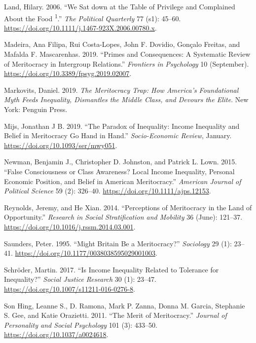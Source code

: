 \documentclass[
]{article}
\begin{document}
\leavevmode\hypertarget{ref-landWeSatTable2006}{}%
Land, Hilary. 2006. ``We Sat down at the Table of Privilege and
Complained About the Food \textsuperscript{1}.'' \emph{The Political
Quarterly} 77 (s1): 45--60.
\url{https://doi.org/10.1111/j.1467-923X.2006.00780.x}.

\leavevmode\hypertarget{ref-MadeiraPrimesConsequencesSystematic2019}{}%
Madeira, Ana Filipa, Rui Costa-Lopes, John F. Dovidio, Gonçalo Freitas,
and Mafalda F. Mascarenhas. 2019. ``Primes and Consequences: A
Systematic Review of Meritocracy in Intergroup Relations.''
\emph{Frontiers in Psychology} 10 (September).
\url{https://doi.org/10.3389/fpsyg.2019.02007}.

\leavevmode\hypertarget{ref-markovits_Meritocracy_2019}{}%
Markovits, Daniel. 2019. \emph{The Meritocracy Trap: How America's
Foundational Myth Feeds Inequality, Dismantles the Middle Class, and
Devours the Elite}. New York: Penguin Press.

\leavevmode\hypertarget{ref-mijs_paradox_2019}{}%
Mijs, Jonathan J B. 2019. ``The Paradox of Inequality: Income Inequality
and Belief in Meritocracy Go Hand in Hand.'' \emph{Socio-Economic
Review}, January. \url{https://doi.org/10.1093/ser/mwy051}.

\leavevmode\hypertarget{ref-newman_false_2015}{}%
Newman, Benjamin J., Christopher D. Johnston, and Patrick L. Lown. 2015.
``False Consciousness or Class Awareness? Local Income Inequality,
Personal Economic Position, and Belief in American Meritocracy.''
\emph{American Journal of Political Science} 59 (2): 326--40.
\url{https://doi.org/10.1111/ajps.12153}.

\leavevmode\hypertarget{ref-reynolds_perceptions_2014}{}%
Reynolds, Jeremy, and He Xian. 2014. ``Perceptions of Meritocracy in the
Land of Opportunity.'' \emph{Research in Social Stratification and
Mobility} 36 (June): 121--37.
\url{https://doi.org/10.1016/j.rssm.2014.03.001}.

\leavevmode\hypertarget{ref-saundersMightBritainBe1995}{}%
Saunders, Peter. 1995. ``Might Britain Be a Meritocracy?''
\emph{Sociology} 29 (1): 23--41.
\url{https://doi.org/10.1177/0038038595029001003}.

\leavevmode\hypertarget{ref-schroder_Income_2017}{}%
Schröder, Martin. 2017. ``Is Income Inequality Related to Tolerance for
Inequality?'' \emph{Social Justice Research} 30 (1): 23--47.
\url{https://doi.org/10.1007/s11211-016-0276-8}.

\leavevmode\hypertarget{ref-son_hing_merit_2011-1}{}%
Son Hing, Leanne S., D. Ramona, Mark P. Zanna, Donna M. Garcia,
Stephanie S. Gee, and Katie Orazietti. 2011. ``The Merit of
Meritocracy.'' \emph{Journal of Personality and Social Psychology} 101
(3): 433--50. \url{https://doi.org/10.1037/a0024618}.
\end{document}
